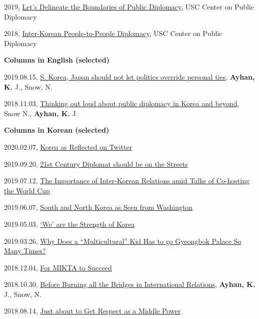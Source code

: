\documentclass[11pt,a4paper,]{awesome-cv}
\begin{document}
2019,
\href{https://www.uscpublicdiplomacy.org/blog/let\%E2\%80\%99s-delineate-boundaries-public-diplomacy}{Let's
Delineate the Boundaries of Public Diplomacy}, USC Center on Public
Diplomacy

2018,
\href{https://www.uscpublicdiplomacy.org/blog/inter-korean-people-people-diplomacy}{Inter-Korean
People-to-People Diplomacy}, USC Center on Public Diplomacy

\textbf{Columns in English (selected)}

2019.08.15,
\href{http://www.koreaherald.com/view.php?ud=20190815000192}{S. Korea,
Japan should not let politics override personal ties},
\textbf{Ayhan, K.} J., Snow, N.

2018.11.03,
\href{http://www.koreatimes.co.kr/www/opinion/2018/11/734_258046.html}{Thinking
out loud about public diplomacy in Korea and beyond}, Snow N.,
\textbf{Ayhan, K.} J.

\textbf{Columns in Korean (selected)}

2020.02.07,
\href{https://www.donga.com/news/List/Series_70040100000265/article/all/20200207/99578393/1}{Korea
as Reflected on Twitter}

2019.09.20,
\href{http://www.donga.com/news/article/all/20190920/97489317/1}{21st
Century Diplomat should be on the Streets}

2019.07.12,
\href{https://www.donga.com/news/List/Series_70040100000265/article/all/20190712/96438479/1}{The
Importance of Inter-Korean Relations amid Talks of Co-hosting the World
Cup}

2019.06.07,
\href{https://www.donga.com/news/List/Series_70040100000265/article/all/20190607/95879632/1}{South
and North Korea as Seen from Washington}

2019.05.03,
\href{http://www.donga.com/news/List/Series_70040100000265/article/all/20190503/95363228/1}{`We'
are the Strength of Korea}

2019.03.26,
\href{http://www.donga.com/news/List/Series_70040100000265/article/all/20190326/94729975/1}{Why
Does a ``Multicultural'' Kid Has to go Gyeongbok Palace So Many Times?}

2018.12.04,
\href{http://www.donga.com/news/List/Series_70040100000265/article/all/20181204/93139052/1}{For
MIKTA to Succeed}

2018.10.30,
\href{http://www.donga.com/news/List/Series_70040100000265/article/all/20181030/92643028/1}{Before
Burning all the Bridges in International Relations}, \textbf{Ayhan, K.}
J., Snow, N.

2018.08.14,
\href{http://www.donga.com/news/List/Series_70040100000265/article/all/20180814/91504198/1}{Just
about to Get Respect as a Middle Power}
\end{document}
